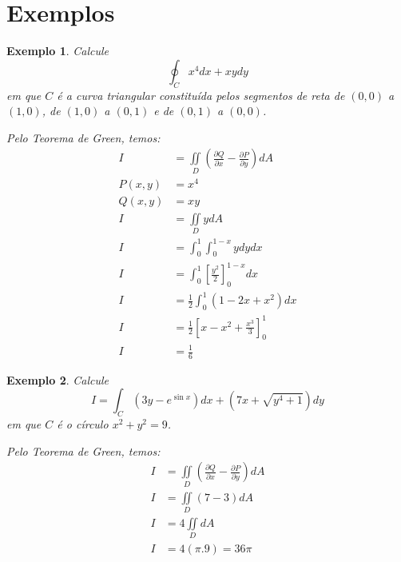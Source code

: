 \documentclass{article}
\newcommand{\doubleint}[2] {\iint\limits_{#1} #2}
\newcommand{\PartialDer}[2] {\frac{\partial #1}{\partial #2}}
\newtheorem{example}{Exemplo}[section]
\begin{document}
    \section{Exemplos}
        \begin{example}
            Calcule
            \[
                \oint_C x^4 dx + xydy
            \]
            em que $C$ é a curva triangular constituída pelos segmentos de reta de $(0,0)$ a $(1, 0)$, de
            $(1, 0)$ a $(0, 1)$ e de $(0, 1)$ a $(0, 0)$.

            Pelo Teorema de Green, temos:
            \begin{align*}
                I &= \doubleint{D}{\left( \PartialDer{Q}{x} - \PartialDer{P}{y} \right)} dA\\
                P(x,y) &= x^4\\
                Q(x,y) &= xy\\
                I &= \doubleint{D}{y} dA\\
                I &= \int_0^1 \int_0^{1 - x} y dy dx\\
                I &= \int_0^1 \left[ \frac{y^2}{2} \right]_0^{1 - x} dx\\
                I &= \frac{1}{2} \int_0^1 (1 - 2x + x^2) dx\\
                I &= \frac{1}{2} \left[ x - x^2 + \frac{x^3}{3} \right]_0^1\\
                I &= \frac{1}{6}
            \end{align*}
        \end{example}

        \begin{example}
            Calcule
            \[
                I = \int_C (3y - e^{\sin x}) dx + (7x + \sqrt{y^4 + 1}) dy
            \]
            em que $C$ é o círculo $x^2 + y^2 = 9$.

            Pelo Teorema de Green, temos:
            \begin{align*}
                I &= \doubleint{D}{\left( \PartialDer{Q}{x} - \PartialDer{P}{y} \right) dA}\\
                I &= \doubleint{D}{(7 - 3) dA}\\
                I &= 4 \doubleint{D}{dA}\\
                I &= 4 (\pi . 9) = 36 \pi\\
            \end{align*}
        \end{example}
\end{document}
